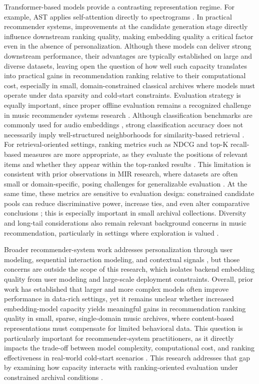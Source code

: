 \documentclass[sigconf]{acmart}
\begin{document}
Transformer-based models provide a contrasting representation regime. For example, AST applies self-attention directly to spectrograms \cite{gong2021ast}. In practical recommender systems, improvements at the candidate generation stage directly influence downstream ranking quality, making embedding quality a critical factor even in the absence of personalization. Although these models can deliver strong downstream performance, their advantages are typically established on large and diverse datasets, leaving open the question of how well such capacity translates into practical gains in recommendation ranking relative to their computational cost, especially in small, domain-constrained classical archives where models must operate under data sparsity and cold-start constraints. Evaluation strategy is equally important, since proper offline evaluation remains a recognized challenge in music recommender systems research \cite{schedl2018}. Although classification benchmarks are commonly used for audio embeddings \cite{gong2021ast, zaman2023}, strong classification accuracy does not necessarily imply well-structured neighborhoods for similarity-based retrieval \cite{tamm2024}. For retrieval-oriented settings, ranking metrics such as NDCG and top-K recall-based measures are more appropriate, as they evaluate the positions of relevant items and whether they appear within the top-ranked results \cite{krichene2020}. This limitation is consistent with prior observations in MIR research, where datasets are often small or domain-specific, posing challenges for generalizable evaluation \cite{urbano2013}. At the same time, these metrics are sensitive to evaluation design: constrained candidate pools can reduce discriminative power, increase ties, and even alter comparative conclusions \cite{krichene2020, canamares2020}; this is especially important in small archival collections. Diversity and long-tail considerations also remain relevant background concerns in music recommendation, particularly in settings where exploration is valued \cite{porcaro2022}.

Broader recommender-system work addresses personalization through user modeling, sequential
interaction modeling, and contextual signals \cite{lin2025, abbattista2024, schedl2021}, but those
concerns are outside the scope of this research, which isolates backend embedding quality from user modeling and large-scale deployment constraints. Overall, prior work has established that larger and more complex models often improve performance in data-rich settings, yet it remains unclear whether increased embedding-model capacity yields meaningful gains in recommendation ranking quality in small, sparse, single-domain music archives, where content-based representations must compensate for limited behavioral data. This question is particularly important for recommender-system practitioners, as it directly impacts the trade-off between model complexity, computational cost, and ranking effectiveness in real-world cold-start scenarios \cite{schedl2018, deldjoo2024, tamm2024}. This research addresses that gap by examining how capacity interacts with ranking-oriented evaluation under constrained archival conditions \cite{tamm2024, krichene2020, canamares2020}.
\end{document}
